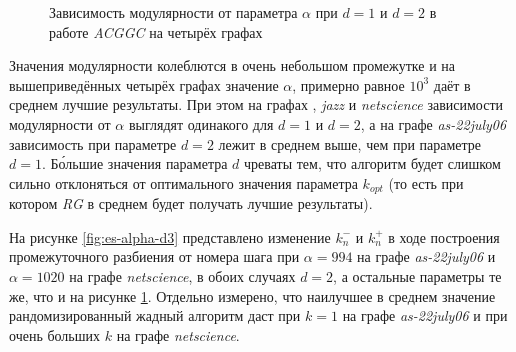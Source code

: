 \begin{figure}[H]
	\caption{Зависимость модулярности от параметра $\alpha$ при $d = 1$ и $d = 2$ в работе \emph{ACGGC} на четырёх графах}
	\label{fig:es-alpha-d}
\end{figure}

Значения модулярности колеблются в очень небольшом промежутке и на вышеприведённых четырёх графах значение $\alpha$, примерно равное $10^3$ даёт в среднем лучшие результаты. При этом на графах \emph{\celegans}, \emph{jazz} и \emph{netscience} зависимости модулярности от $\alpha$ выглядят одинакого для $d = 1$ и $d = 2$, а на графе \emph{as-22july06} зависимость при параметре $d = 2$ лежит в среднем выше, чем при параметре $d = 1$. Б\'{о}льшие значения параметра $d$ чреваты тем, что алгоритм будет слишком сильно отклоняться от оптимального значения параметра $k_{opt}$ (то есть при котором \emph{RG} в среднем будет получать лучшие результаты).

На рисунке \ref{fig:es-alpha-d3} представлено изменение $k^{-}_n$ и $k^{+}_n$ в ходе построения промежуточного разбиения от номера шага при $\alpha = 994$ на графе \emph{as-22july06} и $\alpha = 1020$ на графе \emph{netscience}, в обоих случаях $d = 2$, а остальные параметры те же, что и на рисунке \ref{fig:es-alpha-d}. Отдельно измерено, что наилучшее в среднем значение рандомизированный жадный алгоритм даст при $k = 1$ на графе \emph{as-22july06} и при очень больших $k$ на графе \emph{netscience}.

